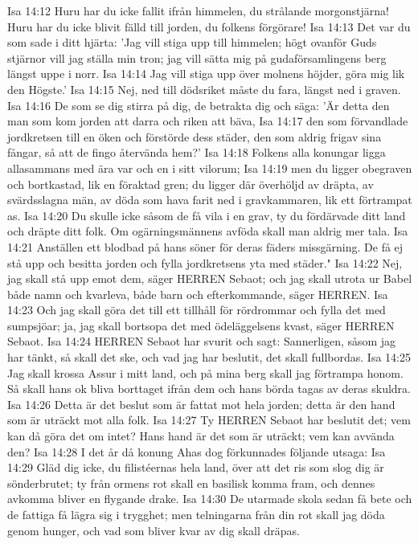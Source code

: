 Isa 14:12  Huru har du icke fallit ifrån himmelen, du strålande morgonstjärna! Huru har du icke blivit fälld till jorden, du folkens förgörare!
Isa 14:13  Det var du som sade i ditt hjärta: 'Jag vill stiga upp till himmelen; högt ovanför Guds stjärnor vill jag ställa min tron; jag vill sätta mig på gudaförsamlingens berg längst uppe i norr.
Isa 14:14  Jag vill stiga upp över molnens höjder, göra mig lik den Högste.'
Isa 14:15  Nej, ned till dödsriket måste du fara, längst ned i graven.
Isa 14:16  De som se dig stirra på dig, de betrakta dig och säga: 'Är detta den man som kom jorden att darra och riken att bäva,
Isa 14:17  den som förvandlade jordkretsen till en öken och förstörde dess städer, den som aldrig frigav sina fångar, så att de fingo återvända hem?'
Isa 14:18  Folkens alla konungar ligga allasammans med ära var och en i sitt vilorum;
Isa 14:19  men du ligger obegraven och bortkastad, lik en föraktad gren; du ligger där överhöljd av dräpta, av svärdsslagna män, av döda som hava farit ned i gravkammaren, lik ett förtrampat as.
Isa 14:20  Du skulle icke såsom de få vila i en grav, ty du fördärvade ditt land och dräpte ditt folk. Om ogärningsmännens avföda skall man aldrig mer tala.
Isa 14:21  Anställen ett blodbad på hans söner för deras fäders missgärning. De få ej stå upp och besitta jorden och fylla jordkretsens yta med städer."
Isa 14:22  Nej, jag skall stå upp emot dem, säger HERREN Sebaot; och jag skall utrota ur Babel både namn och kvarleva, både barn och efterkommande, säger HERREN.
Isa 14:23  Och jag skall göra det till ett tillhåll för rördrommar och fylla det med sumpsjöar; ja, jag skall bortsopa det med ödeläggelsens kvast, säger HERREN Sebaot.
Isa 14:24  HERREN Sebaot har svurit och sagt: Sannerligen, såsom jag har tänkt, så skall det ske, och vad jag har beslutit, det skall fullbordas.
Isa 14:25  Jag skall krossa Assur i mitt land, och på mina berg skall jag förtrampa honom. Så skall hans ok bliva borttaget ifrån dem och hans börda tagas av deras skuldra.
Isa 14:26  Detta är det beslut som är fattat mot hela jorden; detta är den hand som är uträckt mot alla folk.
Isa 14:27  Ty HERREN Sebaot har beslutit det; vem kan då göra det om intet? Hans hand är det som är uträckt; vem kan avvända den?
Isa 14:28  I det år då konung Ahas dog förkunnades följande utsaga:
Isa 14:29  Gläd dig icke, du filistéernas hela land, över att det ris som slog dig är sönderbrutet; ty från ormens rot skall en basilisk komma fram, och dennes avkomma bliver en flygande drake.
Isa 14:30  De utarmade skola sedan få bete och de fattiga få lägra sig i trygghet; men telningarna från din rot skall jag döda genom hunger, och vad som bliver kvar av dig skall dräpas.

